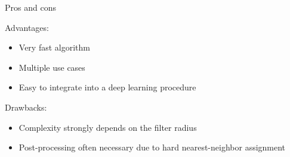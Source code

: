\documentclass{beamer}
\begin{document}
\begin{frame}{Pros and cons}
    
Advantages:
\begin{itemize}
    \item Very fast algorithm
    \item Multiple use cases
    \item Easy to integrate into a deep learning procedure
\end{itemize}

\pause
Drawbacks:
\begin{itemize}
    \item Complexity strongly depends on the filter radius
    \item Post-processing often necessary due to hard nearest-neighbor assignment
\end{itemize}
    
\end{frame}
\end{document}
